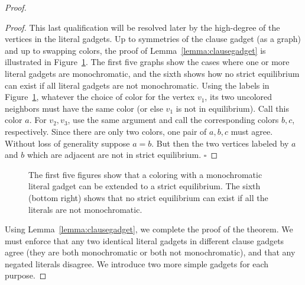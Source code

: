 \documentclass{llncs}
\begin{document}
\begin{proof}
\begin{proof}
This last qualification will be resolved later by the high-degree of the
vertices in the literal gadgets. Up to symmetries of the clause gadget (as a
graph) and up to swapping colors, the proof of Lemma~\ref{lemma:clausegadget}
is illustrated in Figure~\ref{fig:clauselemmaproof}. The first five graphs show the
cases where one or more literal gadgets are monochromatic, and the sixth shows
how no strict equilibrium can exist if all literal gadgets are not
monochromatic. Using the labels in Figure~\ref{fig:clauselemmaproof}, whatever
the choice of color for the vertex $v_1$, its two uncolored neighbors must have
the same color (or else $v_1$ is not in equilibrium). Call this color $a$. For
$v_2, v_3$, use the same argument and call the corresponding colors $b, c$,
respectively. Since there are only two colors, one pair of $a,b,c$ must agree.
Without loss of generality suppose $a=b$. But then the two vertices labeled by
$a$ and $b$ which are adjacent are not in strict equilibrium.
\hfill $\square$
\end{proof}

\begin{figure}[h]
\centering
{}
\caption{The first five figures show
that a coloring with a monochromatic literal gadget can be extended to a strict
equilibrium. The sixth (bottom right) shows that no strict equilibrium can
exist if all the literals are not monochromatic.}
\label{fig:clauselemmaproof}
\end{figure}

Using Lemma~\ref{lemma:clausegadget}, we complete the proof of the theorem. We
must enforce that any two identical literal gadgets in different clause gadgets
agree (they are both monochromatic or both not monochromatic), and that any
negated literals disagree. We introduce two more simple gadgets for each
purpose.


\end{proof}
\end{document}
